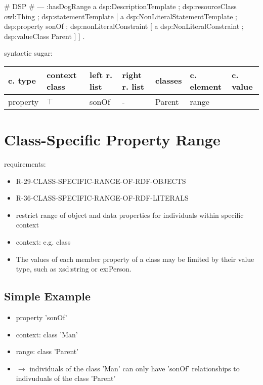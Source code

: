 \documentclass{llncs}
\newenvironment{gcotable}{
  \scriptsize
  \sffamily
  \vspace{0.3cm}
	\begin{center}
  \begin{tabular}{l|l|l|l|l|l|l}
  \hline
  \textbf{c. type} & \textbf{context class} & \textbf{left r. list} & \textbf{right r. list} & \textbf{classes} & \textbf{c. element} & \textbf{c. value} \\
  \hline

}{
  \hline
  \end{tabular}
	\end{center}
}
\begin{document}
\begin{ex}
# DSP
# ---
:hasDogRange
        a dsp:DescriptionTemplate ; 
        dsp:resourceClass owl:Thing ; 
        dsp:statementTemplate [
            a dsp:NonLiteralStatementTemplate ;
            dsp:property sonOf ; 
            dsp:nonLiteralConstraint [ 
                a dsp:NonLiteralConstraint ;
                dsp:valueClass Parent ] ] .
\end{ex}

syntactic sugar:

\begin{gcotable}
property & $\top$ & sonOf & - & Parent & range \\
\end{gcotable}

\section{Class-Specific Property Range}

requirements:

\begin{itemize}
	\item R-29-CLASS-SPECIFIC-RANGE-OF-RDF-OBJECTS
	\item R-36-CLASS-SPECIFIC-RANGE-OF-RDF-LITERALS
\end{itemize}

\begin{itemize}
  \item restrict range of object and data properties for individuals within specific context
	\item context: e.g. class
	\item The values of each member property of a class may be limited by their value type, such as xsd:string or ex:Person. 
\end{itemize}

\subsection{Simple Example}

\begin{itemize}
	\item property 'sonOf'
	\item context: class 'Man'
	\item range: class 'Parent'
	\item $\rightarrow$ individuals of the class 'Man' can only have 'sonOf' relationships to indivuduals of the class 'Parent'
\end{itemize}
\end{document}
